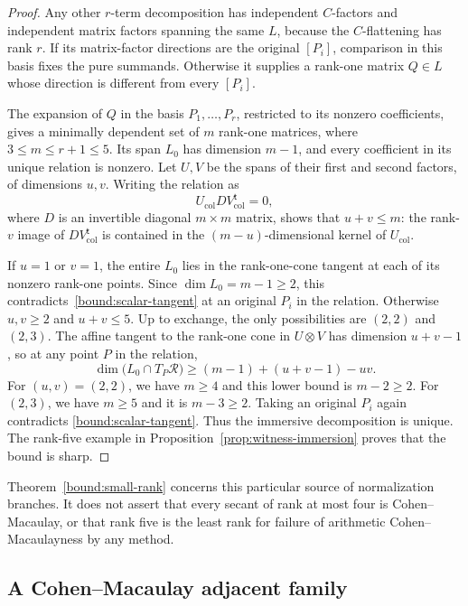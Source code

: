 \begin{proof}
Any other $r$-term decomposition has independent $C$-factors and
independent matrix factors spanning the same $L$, because the
$C$-flattening has rank $r$. If its matrix-factor directions are the
original $[P_i]$, comparison in this basis fixes the pure summands.
Otherwise it supplies a rank-one matrix $Q\in L$ whose direction is
different from every $[P_i]$.

The expansion of $Q$ in the basis $P_1,\ldots,P_r$, restricted to its
nonzero coefficients, gives a minimally dependent set of $m$ rank-one
matrices, where $3\leq m\leq r+1\leq5$. Its span $L_0$ has dimension
$m-1$, and every coefficient in its unique relation is nonzero.
Let $U,V$ be the spans of their first and second factors, of dimensions
$u,v$. Writing the relation as
\[
 U_{\mathrm{col}}D V_{\mathrm{col}}^{\mathsf t}=0,
\]
where $D$ is an invertible diagonal $m\times m$ matrix, shows that
$u+v\leq m$: the rank-$v$ image of $D V_{\mathrm{col}}^{\mathsf t}$
is contained in the $(m-u)$-dimensional kernel of
$U_{\mathrm{col}}$.

If $u=1$ or $v=1$, the entire $L_0$ lies in the rank-one-cone tangent
at each of its nonzero rank-one points. Since $\dim L_0=m-1\geq2$,
this contradicts~\eqref{bound:scalar-tangent} at an original $P_i$
in the relation. Otherwise $u,v\geq2$ and $u+v\leq5$. Up to exchange,
the only possibilities are $(2,2)$ and $(2,3)$. The affine tangent to
the rank-one cone in $U\otimes V$ has dimension $u+v-1$, so at any
point $P$ in the relation,
\[
 \dim\bigl(L_0\cap T_P\mathcal R\bigr)
 \geq (m-1)+(u+v-1)-uv.
\]
For $(u,v)=(2,2)$, we have $m\geq4$ and this lower bound is
$m-2\geq2$. For $(2,3)$, we have $m\geq5$ and it is $m-3\geq2$.
Taking an original $P_i$ again contradicts
\eqref{bound:scalar-tangent}. Thus the immersive decomposition is
unique. The rank-five example in
Proposition~\ref{prop:witness-immersion} proves that the bound is sharp.
\end{proof}

Theorem~\ref{bound:small-rank} concerns this particular source of
normalization branches. It does not assert that every secant of rank
at most four is Cohen--Macaulay, or that rank five is the least rank
for failure of arithmetic Cohen--Macaulayness by any method.

\subsection{A Cohen--Macaulay adjacent family}\label{bound:adjacent-subsection}

